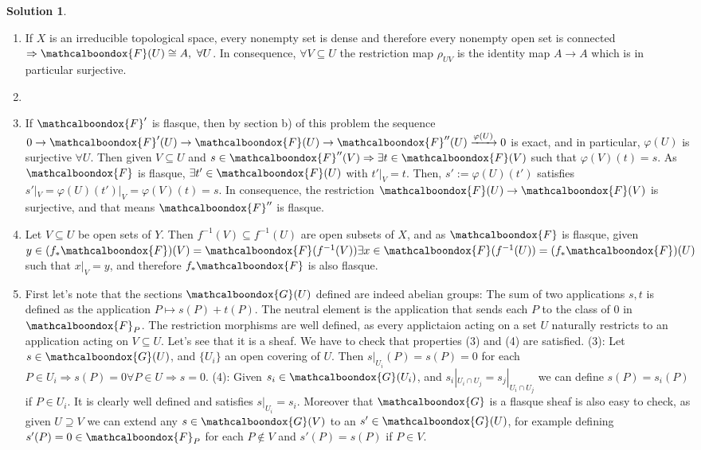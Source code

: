 \documentclass[12pt]{article}
\newcommand{\imp}{\ensuremath{\Rightarrow}}
\theoremstyle{definition}
\newtheorem*{sol}{Solution}
\newcommand{\sF}{\ensuremath{\mathcalboondox{F}}}
\newcommand{\sG}{\ensuremath{\mathcalboondox{G}}}
\begin{document}
\begin{sol}
	\begin{enumerate}[label=\alph*)]
		\item If $X$ is an irreducible topological space, every nonempty set is dense and therefore every nonempty open set is connected $\imp \sF(U) \cong A, \, \, \forall U$. In consequence, $\forall V \subseteq U$ the restriction map $\rho_{UV}$ is the identity map $A \to A$ which is in particular surjective.

		\item %

		\item If $\sF'$ is flasque, then by section b) of this problem the sequence $0 \to \sF'(U) \to \sF(U) \to \sF''(U) \xrightarrow[]{\varphi(U)} 0$ is exact, and in particular, $\varphi(U)$ is surjective $\forall U$. Then given $V \subseteq U$ and $s \in \sF''(V) \imp \exists t \in \sF(V)$ such that $\varphi(V)(t) = s$. As $\sF$ is flasque, $\exists t' \in \sF(U)$ with $t'|_V = t$. Then, $s':= \varphi(U)(t')$ satisfies $s'|_{V} = \varphi(U)(t')|_V = \varphi(V)(t) = s$. In consequence, the restriction $\sF(U) \to \sF(V)$ is surjective, and that means $\sF''$ is flasque.

		\item Let $V \subseteq U$ be open sets of $Y$. Then $f^{-1}(V) \subseteq f^{-1}(U)$ are open subsets of $X$, and as $\sF$ is flasque, given $y \in (f_{*}\sF)(V) = \sF(f^{-1}(V)) \exists x \in \sF(f^{-1}(U)) = (f_{*}\sF)(U)$ such that $x|_V = y$, and therefore $f_{*}\sF$ is also flasque.

		\item First let's note that the sections $\sG(U)$ defined are indeed abelian groups: The sum of two applications $s,t$ is defined as the application $P \mapsto s(P) + t(P)$. The neutral element is the application that sends each $P$ to the class of 0 in $\sF_P$. The restriction morphisms are well defined, as every applictaion acting on a set $U$ naturally restricts to an application acting on $V \subseteq U$. Let's see that it is a sheaf. We have to check that properties (3) and (4) are satisfied. (3): Let $s \in \sG(U)$, and $\{U_i\}$ an open covering of $U$. Then $s|_{U_i}(P) = s(P) = 0$ for each $P \in U_i \imp s(P) = 0 \forall P \in U \imp s = 0$. (4): Given $s_i \in \sG(U_i)$, and $s_i|_{U_i \cap U_j} = s_j|_{U_i \cap U_j} $ we can define $s(P) = s_i(P)$ if $P \in U_i$. It is clearly well defined and satisfies $s|_{U_i} = s_i$.
		Moreover that $\sG$ is a flasque sheaf is also easy to check, as given $U \supseteq V$ we can extend any $s \in \sG(V)$ to an $s' \in \sG(U)$, for example defining $s'(P) = 0 \in \sF_P$ for each $P \notin V$ and $s'(P) = s(P)$ if $P \in V$.


\end{enumerate}
\end{sol}
\end{document}
